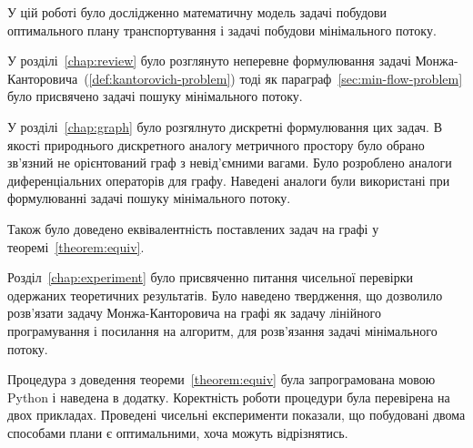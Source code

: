 У цій роботі було дослідженно математичну модель задачі побудови оптимального плану транспортування і
задачі побудови мінімального потоку.

У розділі~\ref{chap:review} було розглянуто неперевне формулювання задачі Монжа-Канторовича~(\ref{def:kantorovich-problem})
тоді як параграф~\ref{sec:min-flow-problem} було присвячено задачі пошуку мінімального потоку.

У розділі~\ref{chap:graph} було розгялнуто дискретні формулювання цих задач. В якості природнього дискретного аналогу
метричного простору було обрано зв'язний не орієнтований граф з невід'ємними вагами. Було розроблено аналоги
диференціальних операторів для графу. Наведені аналоги були використані при формулюванні задачі пошуку мінімального потоку.

Також було доведено еквівалентність поставлених задач на графі у теоремі~\ref{theorem:equiv}.

Розділ~\ref{chap:experiment} було присвяченно питання чисельної перевірки одержаних теоретичних результатів. Було
наведено твердження, що дозволило розв'язати задачу Монжа-Канторовича на графі як задачу
лінійного програмування і посилання на алгоритм, для розв'язання задачі мінімального потоку.

Процедура з доведення теореми~\ref{theorem:equiv} була запрограмована мовою Python і наведена в додатку.
Коректність роботи процедури була перевірена на двох прикладах. 
Проведені чисельні експерименти показали, що побудовані двома способами плани є оптимальними, хоча можуть відрізнятись.